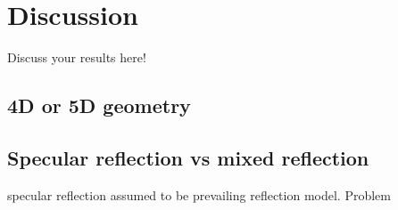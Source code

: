\chapter{Discussion}
\label{chap:discussion}

Discuss your results here!


\section{4D or 5D geometry}

\section{Specular reflection vs mixed reflection}

\cite{PatrickHucker2014EvaluationRuckstreumodells} specular reflection assumed to be prevailing reflection model. Problem